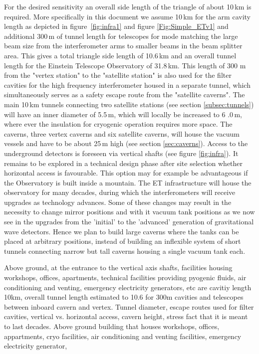 For the desired sensitivity an overall side length of the triangle of about 10\,km is required. More specifically in this document we assume 10\,km for the arm cavity length as depicted in figure~\ref{fig:infra1} and figure \ref{Fig:Simple_ETv1} and additional 300\,m of tunnel length for telescopes for mode matching the large beam size from the interferometer arms to smaller beams in the beam splitter area. This gives a total triangle side length of 10.6\,km and an overall tunnel length for the Einstein Telescope Observatory of 31.8\,km. This length of 300 m from the "vertex station" to the "satellite station" is also used for the filter cavities for the high frequency interferometer housed in a separate tunnel, which simultaneously serves as a safety escape route from the "satellite caverns".  The main 10\,km tunnels connecting two satellite stations (see section \ref{subsec:tunnels}) will have an inner diameter of 5.5\,m, which will locally be increased to 6 .0\,m, where ever the insulation for cryogenic operation requires more space. The caverns, three vertex caverns and six satellite caverns, will house the vacuum vessels and have to be about 25\,m high (see section \ref{sec:caverns}). Access to the underground detectors is foreseen via vertical shafts (see figure \ref{fig:infra}). It remains to be explored in a technical design phase after site selection whether horizontal access is favourable. This option may for example be advantageous if the Observatory is built inside a mountain. The ET infrastructure will house the observatory for many decades, during which the interferometers will receive upgrades as technology advances. Some of these changes may result in the necessity to change mirror positions and with it vacuum tank positions as we now see in the upgrades from the 'initial' to the 'advanced' generation of gravitational wave detectors. Hence we plan to build large caverns where the tanks can be placed at arbitrary positions, instead of building an inflexible system of short tunnels connecting narrow but tall caverns housing a single vacuum tank each.  

Above ground, at the entrance to the vertical axis shafts, facilities housing workshops, offices, apartments, technical facilities providing pyogenic fluids, air conditioning and venting, emergency electricity generators, etc are
cavitiy length 10km, overall tunnel length estimated to 10.6 for 300m cavities and telescopes between inboard cavern and vertex. Tunnel diameter, escape routes used for filter cavities, vertical vs. horizontal access, cavern height, 
stress fact that it is meant to last decades.
Above ground building that houses workshops, offices, appartments, cryo facilities, air conditioning and venting facilities, emergency electricity generator, 
\FloatBarrier
